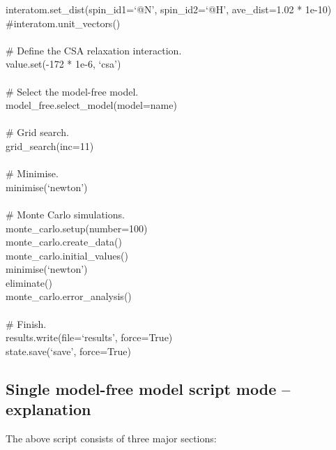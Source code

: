 \begin{htmlonly}
\begin{htmlonly}
\begin{exampleenv}
interatom.set\_dist(spin\_id1=`@N', spin\_id2=`@H', ave\_dist=1.02 * 1e-10) \\
\#interatom.unit\_vectors() \\
 \\
\# Define the CSA relaxation interaction. \\
value.set(-172 * 1e-6, `csa') \\
 \\
\# Select the model-free model. \\
model\_free.select\_model(model=name) \\
 \\
\# Grid search. \\
grid\_search(inc=11) \\
 \\
\# Minimise. \\
minimise(`newton') \\
 \\
\# Monte Carlo simulations. \\
monte\_carlo.setup(number=100) \\
monte\_carlo.create\_data() \\
monte\_carlo.initial\_values() \\
minimise(`newton') \\
eliminate() \\
monte\_carlo.error\_analysis() \\
 \\
\# Finish. \\
results.write(file=`results', force=True) \\
state.save(`save', force=True)
\end{exampleenv}



\subsection{Single model-free model script mode -- explanation}

The above script consists of three major sections:


\end{htmlonly}
\end{htmlonly}
